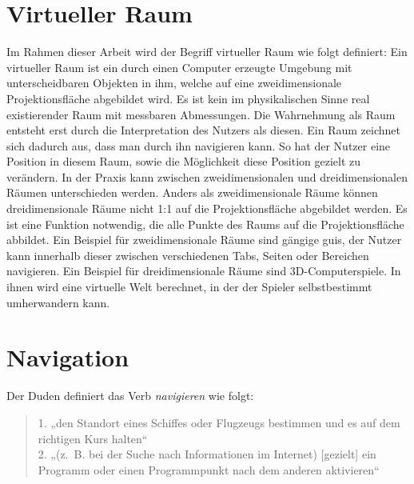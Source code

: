 \section{Virtueller Raum}
Im Rahmen dieser Arbeit wird der Begriff virtueller Raum wie folgt definiert:
Ein virtueller Raum ist ein durch einen Computer erzeugte Umgebung mit unterscheidbaren Objekten in ihm, welche auf eine zweidimensionale Projektionsfläche abgebildet wird.
Es ist kein im physikalischen Sinne real existierender Raum mit messbaren Abmessungen.
Die Wahrnehmung als Raum entsteht erst durch die Interpretation des Nutzers als diesen.
Ein Raum zeichnet sich dadurch aus, dass man durch ihn navigieren kann.
So hat der Nutzer eine Position in diesem Raum, sowie die Möglichkeit diese Position gezielt zu verändern.
In der Praxis kann zwischen zweidimensionalen und dreidimensionalen Räumen unterschieden werden.
Anders als zweidimensionale Räume können dreidimensionale Räume nicht 1:1 auf die Projektionsfläche abgebildet werden.
Es ist eine Funktion notwendig, die alle Punkte des Raums auf die Projektionsfläche abbildet.
Ein Beispiel für zweidimensionale Räume sind gängige \acsp{gui}, der Nutzer kann innerhalb dieser zwischen verschiedenen Tabs, Seiten oder Bereichen navigieren.
Ein Beispiel für dreidimensionale Räume sind 3D-Computerspiele.
In ihnen wird eine virtuelle Welt berechnet, in der der Spieler selbstbestimmt umherwandern kann.

\section{Navigation}
Der Duden definiert das Verb \textit{navigieren} wie folgt:

\begin{quote}
    1. „den Standort eines Schiffes oder Flugzeugs bestimmen und es auf dem richtigen Kurs halten“\\
    2. „(z. B. bei der Suche nach Informationen im Internet) [gezielt] ein Programm oder einen Programmpunkt nach dem anderen aktivieren“
    \cite{DudenNavigierenRechtschreibung}
\end{quote}

